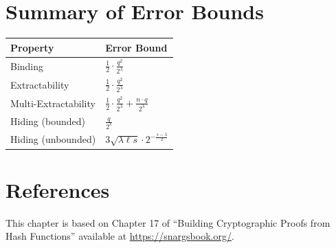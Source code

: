\documentclass{article}
\newcommand{\ROOutputSize}{\lambda}
\newcommand{\ROQueryBound}{q}
\newcommand{\CMMessageLength}{\ell}
\newcommand{\CMSaltSize}{s}
\newcommand{\CMNumCommitments}{n}
\newcommand{\CMBindingExpression}[2]{\frac{1}{2} \cdot \frac{#2^2}{2^{#1}}}
\newcommand{\CMExtractabilityExpression}[2]{\CMBindingExpression{#1}{#2}}
\newcommand{\CMMultiExtractabilityExpression}[3]{\frac{1}{2} \cdot \frac{#2^2}{2^{#1}} + \frac{#3 \cdot #2}{2^{#1}}}
\newcommand{\CMHidingExpressionFinite}[2]{\frac{#2}{2^{#1}}}
\newcommand{\CMHidingExpressionInfinite}[1]{3 \sqrt{\ROOutputSize \CMMessageLength #1} \cdot 2^{-\frac{#1 - \ROOutputSize}{2}}}
\begin{document}
\section{Summary of Error Bounds}

\begin{center}
\begin{tabular}{|l|l|}
\hline
\textbf{Property} & \textbf{Error Bound} \\
\hline
Binding & $\CMBindingExpression{\ROOutputSize}{\ROQueryBound}$ \\
Extractability & $\CMExtractabilityExpression{\ROOutputSize}{\ROQueryBound}$ \\
Multi-Extractability & $\CMMultiExtractabilityExpression{\ROOutputSize}{\ROQueryBound}{\CMNumCommitments}$ \\
Hiding (bounded) & $\CMHidingExpressionFinite{\CMSaltSize}{\ROQueryBound}$ \\
Hiding (unbounded) & $\CMHidingExpressionInfinite{\CMSaltSize}$ \\
\hline
\end{tabular}
\end{center}

\section*{References}

This chapter is based on Chapter 17 of ``Building Cryptographic Proofs from Hash Functions'' available at \url{https://snargsbook.org/}.
\end{document}
